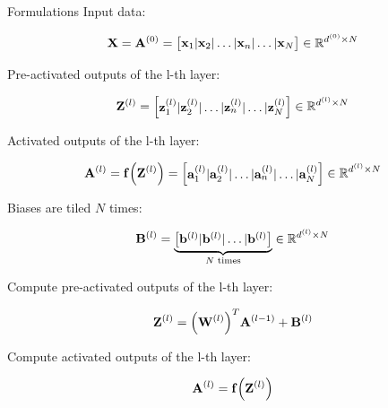 \documentclass[10pt]{beamer}
\theoremstyle{remark}
\theoremstyle{definition}
\begin{document}
\begin{frame}[allowframebreaks]{Formulations}
	Input data:

	\begin{equation}
		\bold{X}=\bold{A}^{(0)}=\begin{bmatrix} \bold{x}_1 \vert \bold{x}_2 \vert \dots \vert \bold{x}_n \vert \dots \vert  \bold{x}_N \end{bmatrix} \in \mathbb{R}^{d^{(0)} \times N}
	\end{equation}

	Pre-activated outputs of the l-th layer:

	\begin{equation}
		\bold{Z}^{(l)}=\begin{bmatrix} \bold{z}_1^{(l)} \vert \bold{z}_2^{(l)} \vert \dots \vert \bold{z}_n^{(l)} \vert \dots \vert \bold{z}_N^{(l)} \end{bmatrix} \in \mathbb{R}^{d^{(l)} \times N}
	\end{equation}

	Activated outputs of the l-th layer:

	\begin{equation}
		\bold{A}^{(l)}=\bold{f}\Big(\bold{Z}^{(l)}\Big)=\begin{bmatrix} \bold{a}_1^{(l)} \vert \bold{a}_2^{(l)} \vert \dots \vert \bold{a}_n^{(l)} \vert \dots \vert \bold{a}_N^{(l)} \end{bmatrix} \in \mathbb{R}^{d^{(l)} \times N}
	\end{equation}

	Biases are tiled $N$ times:

	\begin{equation}
		\bold{B}^{(l)}=\underbrace{\begin{bmatrix} \bold{b}^{(l)} \vert \bold{b}^{(l)} \vert \dots \vert \bold{b}^{(l)} \end{bmatrix}}_{N\text{ times}} \in \mathbb{R}^{d^{(l)} \times N}
	\end{equation}

	Compute pre-activated outputs of the l-th layer:

	\begin{equation}
		\bold{Z}^{(l)}=\Big(\bold{W}^{(l)}\Big)^T\bold{A}^{(l-1)} + \bold{B}^{(l)}
	\end{equation}

	Compute activated outputs of the l-th layer:

	\begin{equation}
		\bold{A}^{(l)} = \bold{f} \Big( \bold{Z}^{(l)} \Big)
	\end{equation}


\end{frame}
\end{document}
